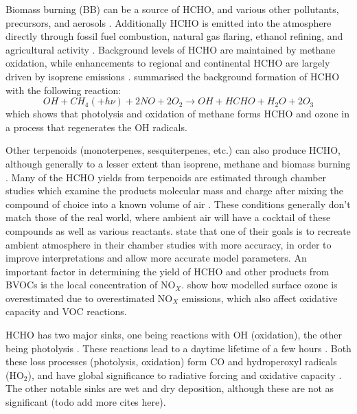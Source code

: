     Biomass burning (BB) can be a source of HCHO, and various other pollutants, precursors, and aerosols \citep{Guenther1995, Andreae2001}.
    Additionally HCHO is emitted into the atmosphere directly through fossil fuel combustion, natural gas flaring, ethanol refining, and agricultural activity \citep{Wolfe2016}.
    Background levels of HCHO are maintained by methane oxidation, while enhancements to regional and continental HCHO are largely driven by isoprene emissions \citep{Guenther1995, Palmer2003, Shim2005, Kefauver2014}.
    \citet{Atkinson2000} summarised the background formation of HCHO with the following reaction:
    \begin{equation} \label{LR:eqn:MethaneBackground}
    OH + CH_4 (+ h\nu) + 2NO + 2O_2 \rightarrow OH + HCHO + H_2O + 2O_3
    \end{equation}
    which shows that photolysis and oxidation of methane forms HCHO and ozone in a process that regenerates the OH radicals.
    
    Other terpenoids (monoterpenes, sesquiterpenes, etc.) can also produce HCHO, although generally to a lesser extent than isoprene, methane and biomass burning \citep{Guenther2012}.
    Many of the HCHO yields from terpenoids are estimated through chamber studies which examine the products molecular mass and charge after mixing the compound of choice into a known volume of air \citep[eg.]{Nguyen2014}.
    These conditions generally don't match those of the real world, where ambient air will have a cocktail of these compounds as well as various reactants.
    \cite{Nguyen2014} state that one of their goals is to recreate ambient atmosphere in their chamber studies with more accuracy, in order to improve interpretations and allow more accurate model parameters.
    An important factor in determining the yield of HCHO and other products from BVOCs is the local concentration of NO$_X$.
    \cite{Travis2016} show how modelled surface ozone is overestimated due to overestimated NO$_X$ emissions, which also affect oxidative capacity and VOC reactions.
    
    
    HCHO has two major sinks, one being reactions with OH (oxidation), the other being photolysis \citep{Crutzen1999, Wagner2002, Levy1972, Kefauver2014}.
    These reactions lead to a daytime lifetime of a few hours \citep{Atkinson2000, Millet2006}.
    Both these loss processes (photolysis, oxidation) form CO and hydroperoxyl radicals (HO$_2$), and have global significance to radiative forcing and oxidative capacity \citep{Franco2015}.
    The other notable sinks are wet and dry deposition, although these are not as significant \citep{Atkinson2000} (todo add more cites here).
    

